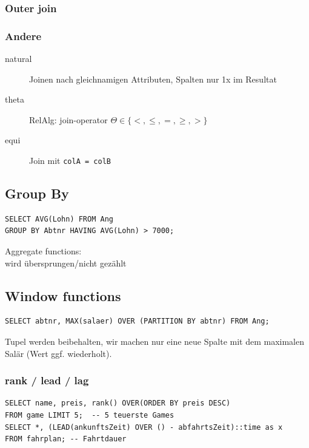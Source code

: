 \begin{multicols*}{3}
\subsubsection{Outer join}

\subsubsection{Andere}
\begin{description}
\item[natural]{Joinen nach gleichnamigen Attributen, Spalten nur 1x im Resultat}
\item[theta]{RelAlg: join-operator $\Theta \in \{<, \leq, =, \geq, >\}$}
\item[equi]{Join mit \verb|colA = colB|}
\end{description}

\subsection{Group By}
\begin{verbatim}
SELECT AVG(Lohn) FROM Ang
GROUP BY Abtnr HAVING AVG(Lohn) > 7000;
\end{verbatim}

Aggregate functions:  \\
 wird übersprungen/nicht gezählt

\subsection{Window functions}
\begin{verbatim}
SELECT abtnr, MAX(salaer) OVER (PARTITION BY abtnr) FROM Ang;
\end{verbatim}

Tupel werden beibehalten, wir machen nur eine neue Spalte mit dem maximalen
Salär (Wert ggf. wiederholt).

\subsubsection{rank / lead / lag}
\begin{verbatim}
SELECT name, preis, rank() OVER(ORDER BY preis DESC)
FROM game LIMIT 5;  -- 5 teuerste Games
SELECT *, (LEAD(ankunftsZeit) OVER () - abfahrtsZeit)::time as x
FROM fahrplan; -- Fahrtdauer
\end{verbatim}


\end{multicols*}
